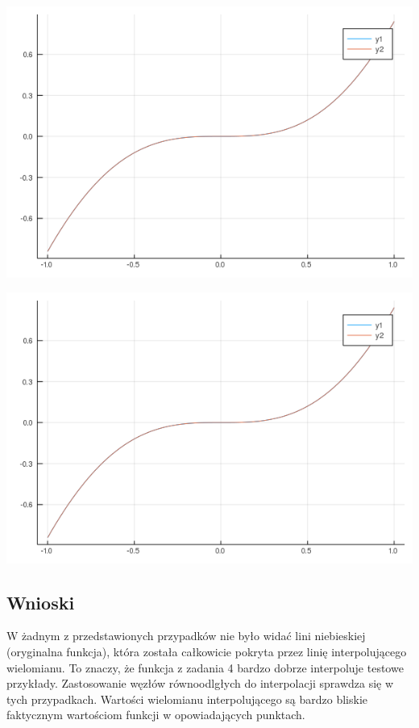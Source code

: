 \documentclass[]{article}
\begin{document}
\begin{minipage}{0.47\linewidth}
	\includegraphics[width=\linewidth]{z5p5.png}
\end{minipage}
\begin{minipage}{0.47\linewidth}
	
	\includegraphics[width=\linewidth]{z5p6.png}
\end{minipage}
\subsection{Wnioski}
W żadnym z przedstawionych przypadków nie było widać lini niebieskiej (oryginalna funkcja), która została całkowicie pokryta przez linię interpolującego wielomianu. To znaczy, że funkcja z zadania 4 bardzo dobrze interpoluje testowe przykłady. Zastosowanie węzłów równoodlgłych do interpolacji sprawdza się w tych przypadkach. Wartości wielomianu interpolującego są bardzo bliskie faktycznym wartościom funkcji w opowiadających punktach.
\end{document}
